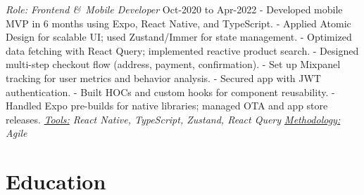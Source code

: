 \documentclass[letterpaper]{twentysecondcv} %
\begin{document}
{\textit{Role: Frontend \&\ Mobile Developer}} \hspace*{97pt} Oct-2020 to Apr-2022
    \newline- Developed mobile MVP in 6 months using Expo, React Native, and TypeScript.
    \newline- Applied Atomic Design for scalable UI; used Zustand/Immer for state management.
    \newline- Optimized data fetching with React Query; implemented reactive product search.
    \newline- Designed multi-step checkout flow (address, payment, confirmation).
    \newline- Set up Mixpanel tracking for user metrics and behavior analysis.
    \newline- Secured app with JWT authentication.
    \newline- Built HOCs and custom hooks for component reusability.
    \newline- Handled Expo pre-builds for native libraries; managed OTA and app store releases.
\newline\newline\textit{\underline{Tools:} React Native, TypeScript, Zustand, React Query \underline{Methodology:} Agile}
\newline\newline


\section{Education}

\begin{twenty} %

\end{twenty}




\end{document}
